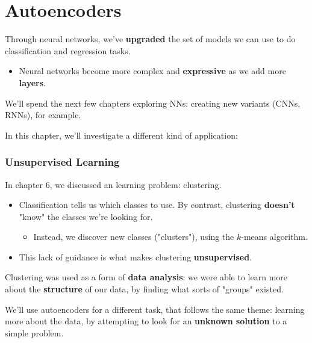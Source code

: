 \setcounter{chapter}{13-1}

\chapter{Autoencoders}

    Through neural networks, we've \textbf{upgraded} the set of models we can use to do classification and regression tasks.

    \begin{itemize}
        \item Neural networks become more complex and \textbf{expressive} as we add more \textbf{layers}.
    \end{itemize}

    We'll spend the next few chapters exploring NNs: creating new variants (CNNs, RNNs), for example.
    
    In this chapter, we'll investigate a different kind of application: 

    \subsection{Unsupervised Learning}

        In chapter 6, we discussed an  learning problem: clustering.

        \begin{itemize}
            \item Classification tells us which classes to use. By contrast, clustering \textbf{doesn't} "know" the classes we're looking for.

            \begin{itemize}
                \item Instead, we discover new classes ("clusters"), using the $k$-means algorithm.
            \end{itemize}
            
            \item This lack of guidance is what makes clustering \textbf{unsupervised}.
        \end{itemize}

        Clustering was used as a form of \textbf{data analysis}: we were able to learn more about the \textbf{structure} of our data, by finding what sorts of "groups" existed.

        We'll use autoencoders for a different task, that follows the same theme: learning more about the data, by attempting to look for an \textbf{unknown solution} to a simple problem.

